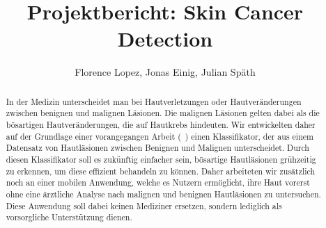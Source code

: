 \documentclass[a4paper, doc]{scrartcl}
\title{Projektbericht: Skin Cancer Detection}
\author{Florence Lopez, Jonas Einig, Julian Späth }
\begin{document}
\maketitle
\begin{abstract}
In der Medizin unterscheidet man bei Hautverletzungen oder Hautveränderungen zwischen benignen und malignen Läsionen. Die malignen Läsionen gelten dabei als die bösartigen Hautveränderungen, die auf Hautkrebs hindeuten. Wir entwickelten daher auf der Grundlage einer vorangegangen Arbeit (~\cite{esteva2017dermatologist}) einen Klassifikator, der aus einem Datensatz von Hautläsionen zwischen Benignen und Malignen unterscheidet. Durch diesen Klassifikator soll es zukünftig einfacher sein, bösartige Hautläsionen grühzeitig zu erkennen, um diese effizient behandeln zu können. Daher arbeiteten wir zusätzlich noch an einer mobilen Anwendung, welche es Nutzern ermöglicht, ihre Haut vorerst ohne eine ärztliche Analyse nach malignen und benignen Hautläsionen zu untersuchen. Diese Anwendung soll dabei keinen Mediziner ersetzen, sondern lediglich als vorsorgliche Unterstützung dienen. 
\end{abstract}
    








\end{document}
